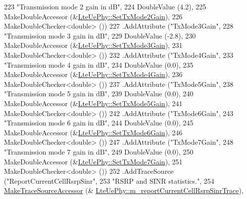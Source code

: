 \begin{DoxyCode}
223                    \textcolor{stringliteral}{"Transmission mode 2 gain in dB"},
224                    DoubleValue (4.2),
225                    MakeDoubleAccessor (&\hyperlink{classns3_1_1LteUePhy_a5f1e724e835f1f2649f1c6dbc605cdff}{LteUePhy::SetTxMode2Gain}),
226                    MakeDoubleChecker<double> ())
227     .AddAttribute (\textcolor{stringliteral}{"TxMode3Gain"},
228                    \textcolor{stringliteral}{"Transmission mode 3 gain in dB"},
229                    DoubleValue (-2.8),
230                    MakeDoubleAccessor (&\hyperlink{classns3_1_1LteUePhy_a184e30e9ca3fa4d1869482e0d621a131}{LteUePhy::SetTxMode3Gain}),
231                    MakeDoubleChecker<double> ())
232     .AddAttribute (\textcolor{stringliteral}{"TxMode4Gain"},
233                    \textcolor{stringliteral}{"Transmission mode 4 gain in dB"},
234                    DoubleValue (0.0),
235                    MakeDoubleAccessor (&\hyperlink{classns3_1_1LteUePhy_ae9c8640332f41ea9560ef0f8b2b9fcac}{LteUePhy::SetTxMode4Gain}),
236                    MakeDoubleChecker<double> ())
237     .AddAttribute (\textcolor{stringliteral}{"TxMode5Gain"},
238                    \textcolor{stringliteral}{"Transmission mode 5 gain in dB"},
239                    DoubleValue (0.0),
240                    MakeDoubleAccessor (&\hyperlink{classns3_1_1LteUePhy_a8c7bce2e0d342ff18303a54124c38497}{LteUePhy::SetTxMode5Gain}),
241                    MakeDoubleChecker<double> ())
242     .AddAttribute (\textcolor{stringliteral}{"TxMode6Gain"},
243                    \textcolor{stringliteral}{"Transmission mode 6 gain in dB"},
244                    DoubleValue (0.0),
245                    MakeDoubleAccessor (&\hyperlink{classns3_1_1LteUePhy_a58386441bb347f679dc42f00e1d7a14b}{LteUePhy::SetTxMode6Gain}),
246                    MakeDoubleChecker<double> ())
247     .AddAttribute (\textcolor{stringliteral}{"TxMode7Gain"},
248                    \textcolor{stringliteral}{"Transmission mode 7 gain in dB"},
249                    DoubleValue (0.0),
250                    MakeDoubleAccessor (&\hyperlink{classns3_1_1LteUePhy_ad190d27a1c71a5c25548d05b2aa6302e}{LteUePhy::SetTxMode7Gain}),
251                    MakeDoubleChecker<double> ())
252     .AddTraceSource (\textcolor{stringliteral}{"ReportCurrentCellRsrpSinr"},
253                      \textcolor{stringliteral}{"RSRP and SINR statistics."},
254                      \hyperlink{group__tracing_gab21a770b9855af4e8f69f7531ea4a6b0}{MakeTraceSourceAccessor} (&
      \hyperlink{classns3_1_1LteUePhy_aded24128cc664f9a3ef6e70d3c3fc430}{LteUePhy::m\_reportCurrentCellRsrpSinrTrace}),

\end{DoxyCode}
